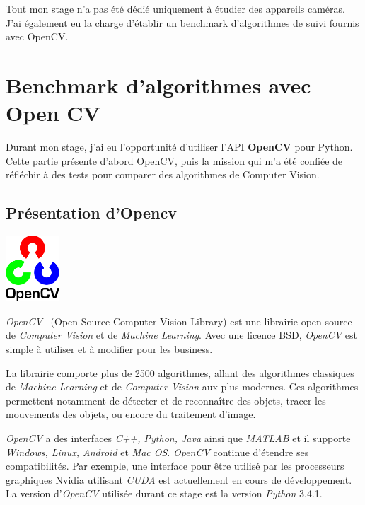 Tout mon stage n'a pas été dédié uniquement à étudier des appareils caméras. J'ai également eu la charge d'établir un benchmark d'algorithmes de suivi fournis avec OpenCV.

\section{Benchmark d'algorithmes avec Open CV}

Durant mon stage, j'ai eu l'opportunité d'utiliser l'API \textbf{OpenCV} pour Python. Cette partie présente d'abord OpenCV, puis la mission qui m'a été confiée de réfléchir à des tests pour comparer des algorithmes de Computer Vision.
  \subsection{Présentation d'Opencv}
  
\begin{minipage}{0.2\textwidth}
  \centering
  \includegraphics[width=2cm]{img/opencv.png}
\end{minipage}
\hfill%
\begin{minipage}{0.7\textwidth}

  \textit{OpenCV}~\cite{aboutOpenCV} (Open Source Computer Vision Library) est une librairie open source de \textit{Computer Vision} et de \textit{Machine Learning}. Avec une licence BSD, \textit{OpenCV} est simple à utiliser et à modifier pour les business.

\end{minipage}\par
  
La librairie comporte plus de 2500 algorithmes, allant des algorithmes classiques de \textit{Machine Learning} et de \textit{Computer Vision} aux plus modernes. Ces algorithmes permettent notamment de détecter et de reconnaître des objets, tracer les mouvements des objets, ou encore du traitement d'image.

\textit{OpenCV} a des interfaces \textit{C++, Python, Java} ainsi que \textit{MATLAB} et il supporte \textit{Windows, Linux, Android} et \textit{Mac OS}. \textit{OpenCV} continue d'étendre ses compatibilités. Par exemple, une interface pour être utilisé par les processeurs graphiques Nvidia utilisant \textit{ CUDA} est actuellement en cours de développement. La version d'\textit{OpenCV} utilisée durant ce stage est la version \textit{Python} 3.4.1.

